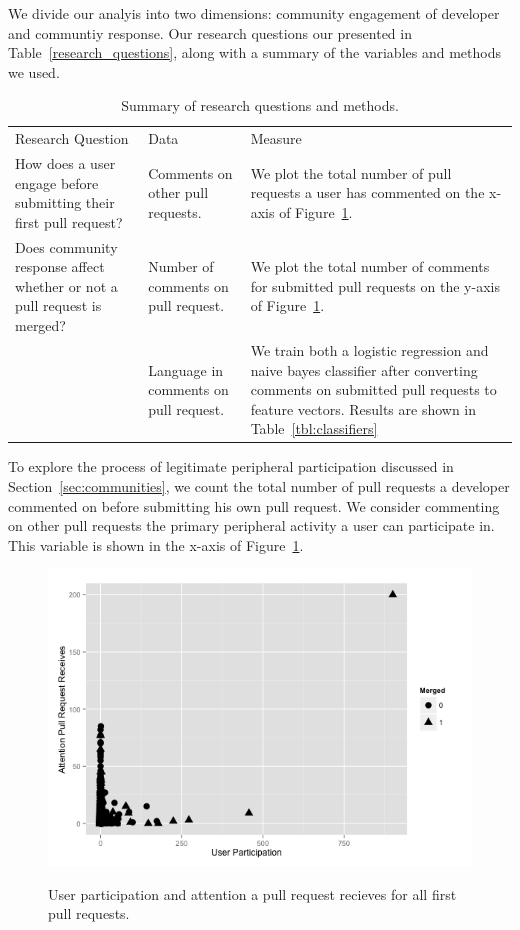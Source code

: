 \documentclass{iitthesis}
\begin{document}
We divide our analyis into two dimensions: community engagement of developer and
communtiy response. Our research questions our presented in
Table~\ref{research_questions}, along with a summary of the variables and
methods we used.

\begin{table} \centering \label{tbl:research_questions}
\caption{Summary of research questions and methods.}
\begin{tabular}{ p{3in} p{3in} p{2in} }
\hline\hline
Research Question
& Data                                  & Measure
\\
How does a user engage before submitting their first pull request?
& Comments on other pull requests.      & We plot the total number
of pull requests a user has commented on the x-axis of
Figure~\ref{fig:aprr_up}.
\\
Does community response affect whether or not a pull request is
merged? & Number of comments on pull request.   & We plot the
total number of comments for submitted pull requests on the
y-axis of Figure~\ref{fig:aprr_up}.
\\
~
& Language in comments on pull request. & We train both a
logistic regression and naive bayes classifier after
converting comments on submitted pull requests to feature
vectors. Results are shown in
Table~\ref{tbl:classifiers} \\
\hline
\end{tabular}
\end{table}

To explore the process of legitimate peripheral participation discussed in
Section~\ref{sec:communities}, we count the total number of pull requests a
developer commented on before submitting his own pull request. We consider
commenting on other pull requests the primary peripheral activity a user can
participate in. This variable is shown in the x-axis of
Figure~\ref{fig:aprr_up}.

\begin{figure}[p] \centering \label{fig:aprr_up}
\includegraphics[scale=0.6]{figures/aprr_up_ggplot.png} \caption{User
participation and attention a pull request recieves for all first pull
requests.} \end{figure}
\end{document}
